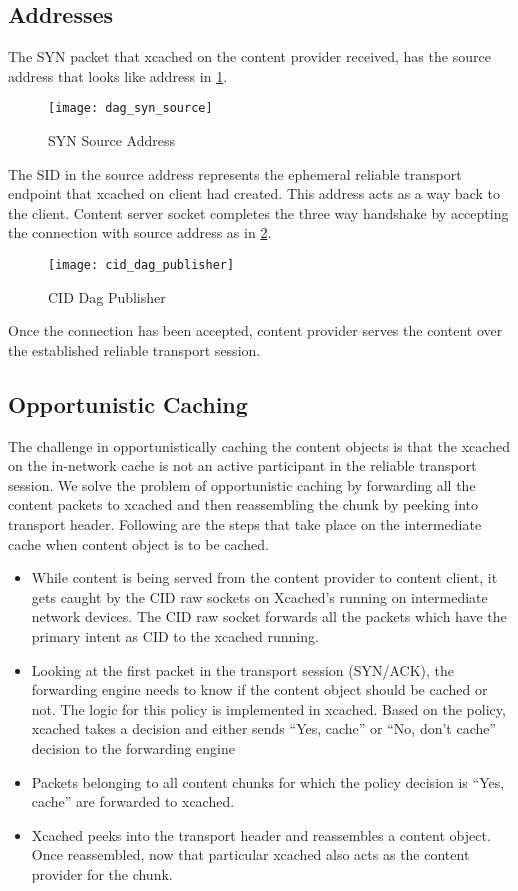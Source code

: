 \subsection{Addresses}
The SYN packet that xcached on the content provider received, has the
source address that looks like address in \ref{fig:dag_syn_source}.

\begin{figure}
  \begin{center}
    \texttt{[image: dag\_syn\_source]}
    \caption{SYN Source Address}
    \label{fig:dag_syn_source}
  \end{center}
\end{figure}
The SID in the source address represents the ephemeral reliable
transport endpoint that xcached on client had created. This address
acts as a way back to the client. Content server socket completes
the three way handshake by accepting the connection with source
address as in \ref{fig:source_cid_addr}.
\begin{figure}
  \begin{center}
    \texttt{[image: cid\_dag\_publisher]}
    \caption{CID Dag Publisher}
    \label{fig:source_cid_addr}
  \end{center}
\end{figure}
Once the connection has been accepted, content provider serves the
content over the established reliable transport session.

\subsection{Opportunistic Caching}
The challenge in opportunistically caching the content objects is that
the xcached on the in-network cache is not an active participant in
the reliable transport session. We solve the problem of opportunistic
caching by forwarding all the content packets to xcached and then
reassembling the chunk by peeking into transport header. Following are
the steps that take place on the intermediate cache when content
object is to be cached.
\begin{itemize}
\item {While content is being served from the content provider to content
client, it gets caught by the CID raw sockets on Xcached's running
on intermediate network devices. The CID raw socket forwards all the
packets which have the primary intent as CID to the xcached
running.}
\item {Looking at the first packet in the transport session (SYN/ACK),
  the forwarding engine needs to know if the content object should be
  cached or not. The logic for this policy is implemented in
  xcached. Based on the policy, xcached takes a decision and either
  sends ``Yes, cache'' or ``No, don't cache'' decision to the
  forwarding engine}
\item {Packets belonging to all content chunks for which the policy
  decision is ``Yes, cache'' are forwarded to xcached.}
\item {Xcached peeks into the transport header and reassembles a
  content object. Once reassembled, now that particular xcached also
  acts as the content provider for the chunk.}
\end{itemize}


